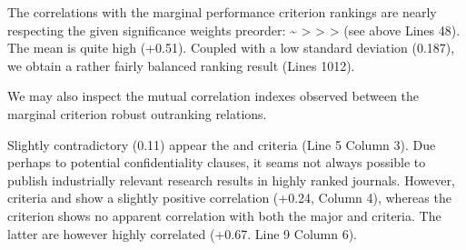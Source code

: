 \documentclass[a4paper,12pt,english]{sphinxhowto}
\begin{document}
The correlations with the marginal performance criterion rankings are nearly respecting the given significance weights preorder:  \textasciitilde{}  \textgreater{}  \textgreater{}  \textgreater{}  (see above Lines 4\sphinxhyphen{}8). The mean  is quite high (+0.51). Coupled with a low standard deviation (0.187), we obtain a rather fairly balanced ranking result (Lines 10\sphinxhyphen{}12).

We may also inspect the mutual correlation indexes observed between the marginal criterion robust outranking relations.

\begin{sphinxVerbatim}[commandchars=\\\{\},numbers=left,firstnumber=1,stepnumber=1]
\end{sphinxVerbatim}

Slightly contradictory (\sphinxhyphen{}0.11) appear the  and  criteria (Line 5 Column 3). Due perhaps to potential confidentiality clauses, it seams not always possible to publish industrially relevant research results in highly ranked journals. However, criteria  and  show a slightly positive correlation (+0.24, Column 4), whereas the  criterion shows no apparent correlation with both the major  and  criteria. The latter are however highly correlated (+0.67. Line 9 Column 6).
\end{document}
